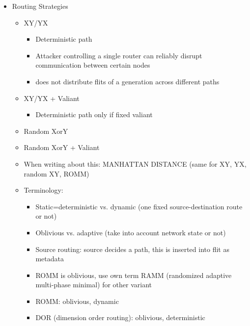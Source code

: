 \iffalse
\begin{itemize}
    \item Routing Strategies
        \begin{itemize}
            \item XY/YX
                \begin{itemize}
                    \item Deterministic path
                    \item Attacker controlling a single router can reliably disrupt communication between certain nodes
                    \item does not distribute flits of a generation across different paths
                \end{itemize}
            \item XY/YX + Valiant
                \begin{itemize}
                    \item Deterministic path only if fixed valiant
                \end{itemize}
            \item Random XorY
            \item Random XorY + Valiant
            \item When writing about this: MANHATTAN DISTANCE (same for XY, YX, random XY, ROMM)
            \item Terminology:
                \begin{itemize}
                    \item Static=deterministic vs. dynamic (one fixed source-destination route or not)
                    \item Oblivious vs. adaptive (take into account network state or not)
                    \item Source routing: source decides a path, this is inserted into flit as metadata
                    \item ROMM is oblivious, use own term RAMM (randomized adaptive multi-phase minimal) for other variant
                    \item ROMM: oblivious, dynamic
                    \item DOR (dimension order routing): oblivious, deterministic
                \end{itemize}
        \end{itemize}
\end{itemize}

